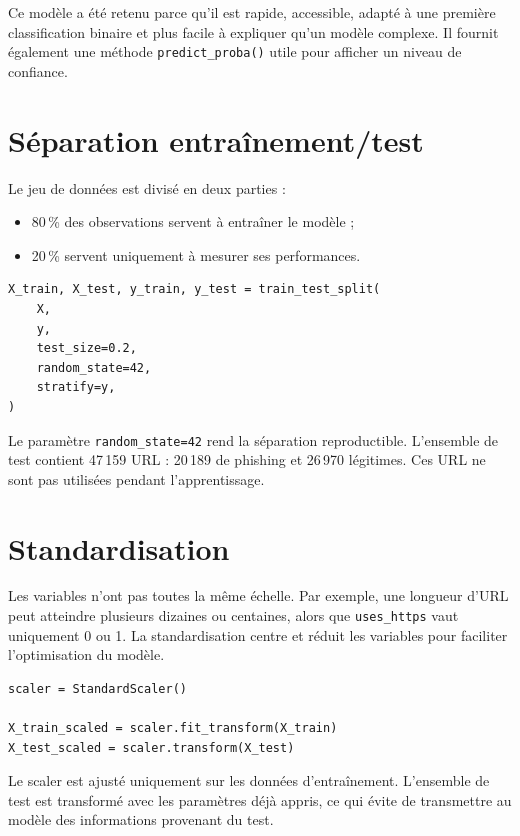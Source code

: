 \documentclass[11pt,a4paper]{report}
\begin{document}
Ce modèle a été retenu parce qu'il est rapide, accessible, adapté à une
première classification binaire et plus facile à expliquer qu'un modèle
complexe. Il fournit également une méthode \texttt{predict\_proba()} utile
pour afficher un niveau de confiance.

\section{Séparation entraînement/test}

Le jeu de données est divisé en deux parties :

\begin{itemize}
  \item 80\,\% des observations servent à entraîner le modèle ;
  \item 20\,\% servent uniquement à mesurer ses performances.
\end{itemize}

\begin{lstlisting}[caption={Séparation stratifiée des données}]
X_train, X_test, y_train, y_test = train_test_split(
    X,
    y,
    test_size=0.2,
    random_state=42,
    stratify=y,
)
\end{lstlisting}

Le paramètre \texttt{random\_state=42} rend la séparation reproductible.
L'ensemble de test contient 47\,159 URL : 20\,189 de phishing et 26\,970
légitimes. Ces URL ne sont pas utilisées pendant l'apprentissage.

\section{Standardisation}

Les variables n'ont pas toutes la même échelle. Par exemple, une longueur
d'URL peut atteindre plusieurs dizaines ou centaines, alors que
\texttt{uses\_https} vaut uniquement 0 ou 1. La standardisation centre et
réduit les variables pour faciliter l'optimisation du modèle.

\begin{lstlisting}[caption={Standardisation sans fuite de données}]
scaler = StandardScaler()

X_train_scaled = scaler.fit_transform(X_train)
X_test_scaled = scaler.transform(X_test)
\end{lstlisting}

Le scaler est ajusté uniquement sur les données d'entraînement. L'ensemble de
test est transformé avec les paramètres déjà appris, ce qui évite de transmettre
au modèle des informations provenant du test.
\end{document}
